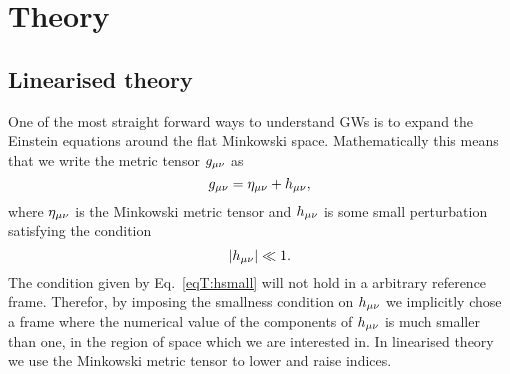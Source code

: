 

\chapter{Theory}
\section{Linearised theory}
One of the most straight forward ways to understand 
GWs is to expand the Einstein equations around the 
flat Minkowski space. Mathematically this means that we write the
metric tensor $g_{\mu\nu}$ as
\begin{equation} \label{eqT:metric}
g_{\mu\nu} = \eta_{\mu\nu} + h_{\mu\nu},
\end{equation}
where $\eta_{\mu\nu}$ is the Minkowski metric tensor and $h_{\mu\nu}$
is some small perturbation satisfying the condition
\begin{equation} \label{eqT:hsmall}
|h_{\mu\nu}|  \ll 1.
\end{equation}
The condition given by Eq.~\ref{eqT:hsmall} will not hold in a arbitrary 
reference frame. Therefor, by imposing the smallness condition on $h_{\mu\nu}$
we implicitly chose a frame where the numerical value of the components of $h_{\mu\nu}$ is much smaller than one,
in the region of space which we are interested in. In linearised theory we use the Minkowski metric tensor
to lower and raise indices. 

